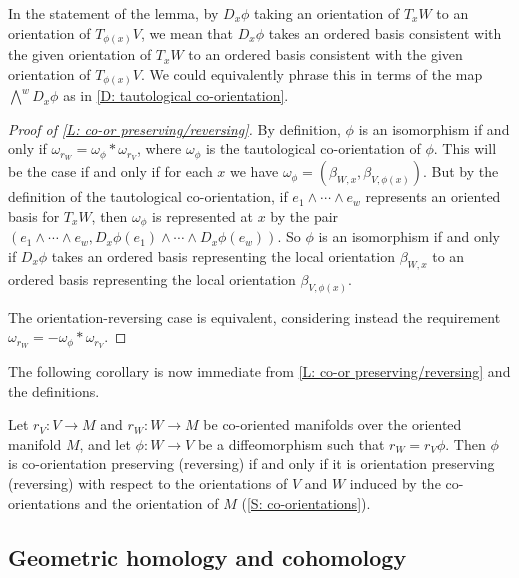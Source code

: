 In the statement of the lemma, by $D_x\phi$ taking an orientation of $T_xW$ to an orientation of $T_{\phi(x)}V$, we mean that $D_x\phi$ takes an ordered basis consistent with the given orientation of $T_xW$ to an ordered basis consistent with the given orientation of $T_{\phi(x)}V$.
We could equivalently phrase this in terms of the map $\textstyle{\bigwedge^w}D_x\phi$ as in \cref{D: tautological co-orientation}.

\begin{proof}[Proof of \cref{L: co-or preserving/reversing}]
By definition, $\phi$ is an isomorphism if and only if $\omega_{r_W} = \omega_{\phi} * \omega_{r_V}$, where $\omega_\phi$ is the tautological co-orientation of $\phi$.
This will be the case if and only if for each $x$ we have $\omega_\phi = (\beta_{W,x}, \beta_{V, \phi(x)})$.
But by the definition of the tautological co-orientation, if $e_1 \wedge \cdots \wedge e_w$ represents an oriented basis for $T_xW$, then $\omega_\phi$ is represented at $x$ by the pair $(e_1 \wedge \cdots \wedge e_w, D_x\phi(e_1) \wedge \cdots \wedge D_x\phi(e_w))$.
So $\phi$ is an isomorphism if and only if $D_x\phi$ takes an ordered basis representing the local orientation $\beta_{W,x}$ to an ordered basis representing the local orientation $\beta_{V, \phi(x)}$.

The orientation-reversing case is equivalent, considering instead the requirement $\omega_{r_W} = - \omega_{\phi} * \omega_{r_V}$.
\end{proof}

The following corollary is now immediate from \cref{L: co-or preserving/reversing} and the definitions.

\begin{corollary}\label{C: co-or preserving is or preserving}
	Let $r_V \colon V \to M$ and $r_W \colon W \to M$ be co-oriented manifolds over the oriented manifold $M$, and let $\phi \colon W \to V$ be a diffeomorphism such that $r_W = r_V \phi$. Then $\phi$ is co-orientation preserving (reversing) if and only if it is orientation preserving (reversing) with respect to the orientations of $V$ and $W$ induced by the co-orientations and the orientation of $M$ (\cref{S: co-orientations}).
\end{corollary}



\subsection{Geometric homology and cohomology}

